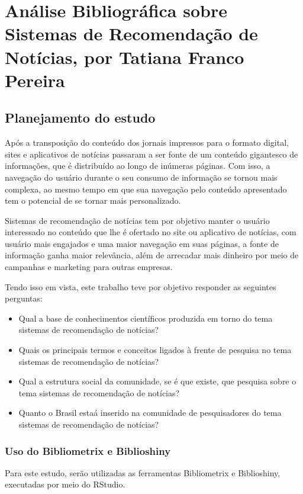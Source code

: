 \chapter{Análise Bibliográfica sobre Sistemas de Recomendação de Notícias, por Tatiana Franco Pereira\label{chap:bibliometria:Tatianafp}}

\section{Planejamento do estudo}

Após a transposição do conteúdo dos jornais impressos para o formato digital, sites e aplicativos de notícias passaram a ser fonte de um conteúdo gigantesco de informações, que é distribuído ao longo de inúmeras páginas. Com isso, a navegação do usuário durante o seu consumo de informação se tornou mais complexa, ao mesmo tempo em que sua navegação pelo conteúdo apresentado tem o potencial de se tornar mais personalizado. 

Sistemas de recomendação de notícias tem por objetivo manter o usuário interessado no conteúdo que lhe é ofertado no site ou aplicativo de notícias, com usuário mais engajados e uma maior navegação em suas páginas, a fonte de informação ganha maior relevância, além de arrecadar mais dinheiro por meio de campanhas e marketing para outras empresas. 

Tendo isso em vista, este trabalho teve por objetivo responder as seguintes perguntas:
\begin{itemize}
    \item Qual a base de conhecimentos científicos produzida em torno do tema sistemas de recomendação de notícias? 
    \item Quais os principais termos e conceitos ligados à frente de pesquisa no tema sistemas de recomendação de notícias? 
    \item Qual a estrutura social da comunidade, se é que existe, que pesquisa sobre o tema sistemas de recomendação de notícias?
    \item Quanto o Brasil estaá inserido na comunidade de pesquisadores do tema sistemas de recomendação de notícias? 
\end{itemize}

\subsection{Uso do Bibliometrix e Biblioshiny}

Para este estudo, serão utilizadas as ferramentas Bibliometrix e Biblioshiny, executadas por meio do RStudio.

